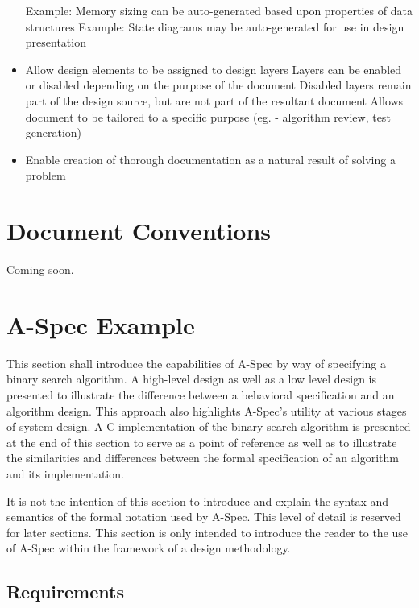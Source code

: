 \documentclass[letterpaper,10pt,draft]{book}
\begin{document}
\begin{itemize}
      \subitem Example: Memory sizing can be auto-generated based upon properties of data structures
      \subitem Example: State diagrams may be auto-generated for use in design presentation
   \item Allow design elements to be assigned to design layers
      \subitem Layers can be enabled or disabled depending on the purpose of the document
      \subitem Disabled layers remain part of the design source, but are not part of the resultant document
      \subitem Allows document to be tailored to a specific purpose (eg. - algorithm review, test generation)
   \item Enable creation of thorough documentation as a natural result of solving a problem
\end{itemize}

\section{Document Conventions}
   \label{sect:Conventions}

Coming soon.

\newpage
\section{A-Spec Example}
   \label{sect:FirstExample}

This section shall introduce the capabilities of A-Spec by way of specifying a binary
search algorithm.  A high-level design as well as a low level design is presented
to illustrate the difference between a behavioral specification and an algorithm
design.  This approach also highlights A-Spec's utility at various stages of system
design.  A C implementation of the binary search algorithm is presented at the end
of this section to serve as a point of reference as well as to illustrate the similarities
and differences between the formal specification of an algorithm and its implementation.

It is not the intention of this section to introduce and explain the syntax and
semantics of the formal notation used by A-Spec.  This level of detail is reserved
for later sections.  This section is only intended to introduce the reader to the
use of A-Spec within the framework of a design methodology.

\subsection{Requirements}
   \label{sect:FirstExReq}
\end{document}
